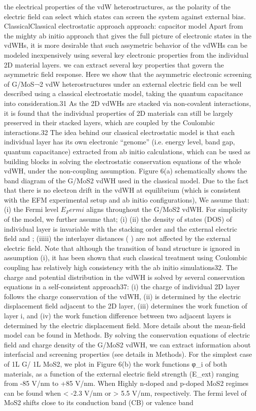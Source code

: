 the electrical properties of the vdW heterostructures, as the polarity of the electric field can select which states can screen the system against external bias. 
ClassicalClassical electrostatic approach approach: capacitor model
Apart from the mighty ab initio approach that gives the full picture of electronic states in the vdWHs, it is more desirable that such assymetric behavior of the vdWHs can be modeled inexpensively using several key electronic properties from the individual 2D material layers. we can extract several key properties that govern the asymmetric field response. Here we show that the asymmetric electronic screening of G/MoS¬2 vdW heterostructures under an external electric field can be well described using a classical electrostatic model, taking the quantum capacitance into consideration.31 As the 2D vdWHs are stacked via non-covalent interactions, it is found that the individual properties of 2D materials can still be largely preserved in their stacked layers, which are coupled by the Coulombic interactions.32 The idea behind our classical electrostatic model is that each individual layer has its own electronic “genome” (i.e. energy level, band gap, quantum capacitance) extracted from ab initio calculations, which can be used as building blocks in solving the electrostatic conservation equations of the whole vdWH, under the non-coupling assumption. Figure 6(a) schematically shows the band diagram of the G/MoS2 vdWH used in the classical model. Due to the fact that there is no electron drift in the vdWH at equilibrium (which is consistent with the EFM experimental setup and ab initio configurations), We assume that: (i) the Fermi level $E_Fermi$ aligns throughout the G/MoS2 vdWH. For simplicity of the model, we further assume that; (i)  (ii) the density of states (DOS) of individual layer is invariable with the stacking order and the external electric field and ; (iiiii) the interlayer distances ( ) are not affected by the external electric field. Note that although the transition of band structure is ignored in assumption (i), it has been shown that such classical treatment using Coulombic coupling has relatively high consistency with the ab initio simulations32. The charge and potential distribution in the vdWH is solved by several conservation equations in a self-consistent approach37: (i) the charge of individual 2D layer   follows the charge conservation of the vdWH, (ii)   is determined by the electric displacement field adjacent to the 2D layer, (iii)  determines the work function of layer i,   and (iv) the work function difference between two adjacent layers is determined by the electric displacement field. More details about the mean-field model can be found in Methods. By solving the conservation equations of electric field and charge density of the G/MoS2 vdWH, we can extract information about interfacial and screening properties (see details in Methods). For the simplest case of 1L G/ 1L MoS2, we plot in Figure 6(b) the work functions φ\_i of both materials, as a function of the external electric field strength (E\_ext) ranging from -85 V/nm to +85 V/nm. When Highly n-doped and p-doped MoS2 regimes can be found when   < -2.3 V/nm or   > 5.5 V/nm, respectively. The fermi level of MoS2 shifts close to its conduction band (CB) or valence band 